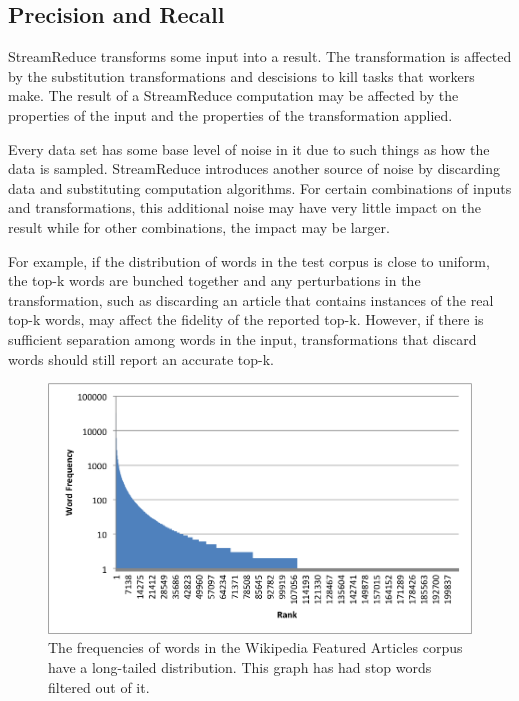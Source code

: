 \documentclass[12pt,twocolumn]{article}
\begin{document}
\subsection{Precision and Recall}
StreamReduce transforms some input into a result. The transformation is affected by
the substitution transformations and descisions to kill tasks that workers make.
The result of a StreamReduce computation may be affected by the properties of the input
and the properties of the transformation applied.

Every data set has some base level of noise in it due to such things as how the data is
sampled. StreamReduce introduces another source of noise by discarding data and
substituting computation algorithms. For certain combinations of inputs and transformations,
this additional noise may have very little impact on the result
while for other combinations, the impact may be larger.

For example, if the distribution of words in the test corpus is close to uniform, the top-k
words are bunched together and any perturbations in the transformation,
such as discarding an
article that contains instances of the real top-k words, may affect the fidelity of the
reported top-k. However, if there is sufficient separation among words in the input,
transformations that discard words should still report an accurate top-k.





\begin{figure}
\includegraphics[width=\linewidth]{long-tail-ranks.png}
\caption{The frequencies of words in the Wikipedia Featured Articles corpus have a
long-tailed distribution. This graph has had stop words~\cite{stopwords} filtered out of it.}
\label{fig:wordDist}
\end{figure}
\end{document}
